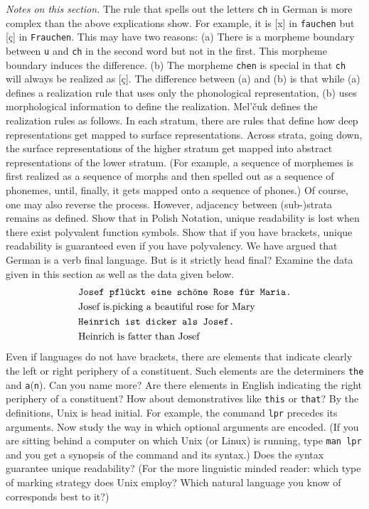 {\it Notes on this section.} The rule that spells out 
the letters \mbox{\tt ch} in German is more complex than the above 
explications show. For example, it is [x] in {\tt fauchen} 
but [\c{c}] in {\tt Frauchen}. This may have two reasons: 
(a) There is a morpheme boundary between {\tt u} and {\tt ch} 
in the second word but not in the first. This morpheme boundary 
induces the difference. (b) The morpheme {\tt chen} is special 
in that \mbox{\tt ch} will always be realized as [\c{c}]. The 
difference between (a) and (b) is that while (a) defines a 
realization rule that uses only the phonological 
representation, (b) uses morphological information to define 
the realization. Mel'\v{c}uk 
defines the realization rules 
as follows. In each stratum, there are rules that define how 
deep representations get mapped to surface representations. 
Across strata, going down, the surface representations of the 
higher stratum get mapped into abstract representations of 
the lower stratum. (For example, a sequence of morphemes is 
first realized as a sequence of morphs and then spelled out 
as a sequence of phonemes, until, finally, it gets mapped 
onto a sequence of phones.) Of course, one may also reverse 
the process. However, adjacency between (sub-)strata remains 
as defined. 
\vplatz
\exercise
Show that in Polish Notation, unique readability is lost when
there exist polyvalent function symbols.
\vplatz
\exercise
Show that if you have brackets, unique readability is guaranteed
even if you have polyvalency.
\vplatz
\exercise
We have argued that German is a verb final language. But is it
strictly head final? Examine the data given in this section
as well as the data given below.
\begin{align}
 & \mbox{\tt Josef pfl\"uckt eine sch\"one Rose f\"ur Maria.} \\\notag
 & \mbox{Josef is.picking a beautiful rose for Mary} \\
 & \mbox{\tt Heinrich ist dicker als Josef.} \\\notag
 & \mbox{Heinrich is fatter than Josef}
\end{align}
\vplatz
\exercise
Even if languages do not have brackets, there are elements that
indicate clearly the left or right periphery of a constituent.
Such elements are the determiners {\tt the} and {\tt a}({\tt n}).
Can you name more? Are there elements in English indicating the
right periphery of a constituent? How about demonstratives like
{\tt this} or {\tt that}?
\vplatz %
\exercise %
By the definitions, Unix is head initial. For example, the
command {\tt lpr} precedes its arguments. Now study the way
in which optional arguments are encoded. (If you are sitting
behind a computer on which Unix (or Linux) is running, 
type {\tt man lpr} and you get a synopsis of the command and its 
syntax.) Does the syntax guarantee unique readability? (For the more 
linguistic minded reader: which type of marking strategy does 
Unix employ?  Which natural language you know of corresponds 
best to it?)
